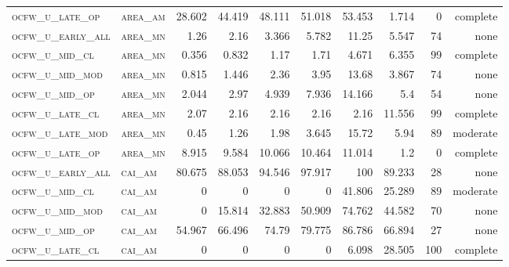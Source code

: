 \begin{landscape}
\begin{center}
\begin{footnotesize}
\begin{longtable}{llrrrrr|rrr}
\textsc{ocfw\_u\_late\_op  } & \textsc{area\_am  }    & 28.602   & 44.419   & 48.111   & 51.018   & 53.453    & 1.714         & 0             & complete           \\
\textsc{ocfw\_u\_early\_all} & \textsc{area\_mn  }    & 1.26     & 2.16     & 3.366    & 5.782    & 11.25     & 5.547         & 74            & none       \\
\textsc{ocfw\_u\_mid\_cl   } & \textsc{area\_mn  }    & 0.356    & 0.832    & 1.17     & 1.71     & 4.671     & 6.355         & 99            & complete       \\
\textsc{ocfw\_u\_mid\_mod  } & \textsc{area\_mn  }    & 0.815    & 1.446    & 2.36     & 3.95     & 13.68     & 3.867         & 74            & none       \\
\textsc{ocfw\_u\_mid\_op   } & \textsc{area\_mn  }    & 2.044    & 2.97     & 4.939    & 7.936    & 14.166    & 5.4           & 54            & none       \\
\textsc{ocfw\_u\_late\_cl  } & \textsc{area\_mn  }    & 2.07     & 2.16     & 2.16     & 2.16     & 2.16      & 11.556        & 99            & complete       \\
\textsc{ocfw\_u\_late\_mod } & \textsc{area\_mn  }    & 0.45     & 1.26     & 1.98     & 3.645    & 15.72     & 5.94          & 89            & moderate       \\
\textsc{ocfw\_u\_late\_op  } & \textsc{area\_mn  }    & 8.915    & 9.584    & 10.066   & 10.464   & 11.014    & 1.2           & 0             & complete           \\
\textsc{ocfw\_u\_early\_all} & \textsc{cai\_am   }    & 80.675   & 88.053   & 94.546   & 97.917   & 100       & 89.233        & 28            & none       \\
\textsc{ocfw\_u\_mid\_cl   } & \textsc{cai\_am   }    & 0        & 0        & 0        & 0        & 41.806    & 25.289        & 89            & moderate       \\
\textsc{ocfw\_u\_mid\_mod  } & \textsc{cai\_am   }    & 0        & 15.814   & 32.883   & 50.909   & 74.762    & 44.582        & 70            & none       \\
\textsc{ocfw\_u\_mid\_op   } & \textsc{cai\_am   }    & 54.967   & 66.496   & 74.79    & 79.775   & 86.786    & 66.894        & 27            & none       \\
\textsc{ocfw\_u\_late\_cl  } & \textsc{cai\_am   }    & 0        & 0        & 0        & 0        & 6.098     & 28.505        & 100           & complete            \\

\end{longtable}
\end{footnotesize}
\end{center}
\end{landscape}
